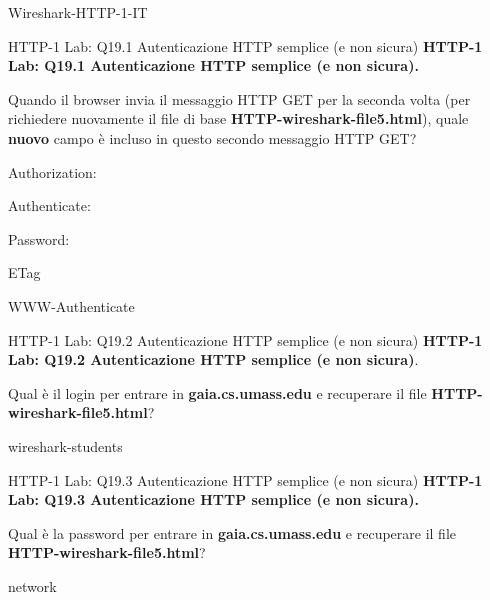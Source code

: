 \documentclass[a4paper]{article}
\begin{document}
\begin{quiz}{Wireshark-HTTP-1-IT}
\begin{multi}[points=1,shuffle]{HTTP-1 Lab: Q19.1 Autenticazione HTTP semplice (e non sicura)}
\textbf{HTTP-1 Lab: Q19.1 Autenticazione HTTP semplice (e non sicura).}

Quando il browser invia il messaggio HTTP GET per la seconda volta (per richiedere nuovamente il file di base \textbf{HTTP-wireshark-file5.html}), quale \textbf{nuovo} campo è incluso in questo secondo messaggio HTTP GET?
\item* Authorization:
\item Authenticate:
\item Password:
\item ETag
\item WWW-Authenticate
\end{multi}

\begin{shortanswer}[points=1]{HTTP-1 Lab: Q19.2 Autenticazione HTTP semplice (e non sicura)}
\textbf{HTTP-1 Lab: Q19.2 Autenticazione HTTP semplice (e non sicura)}.

Qual è il login per entrare in \textbf{gaia.cs.umass.edu} e recuperare il file \textbf{HTTP-wireshark-file5.html}?
\item wireshark-students
\end{shortanswer}

\begin{shortanswer}[points=1,shuffle]{HTTP-1 Lab: Q19.3 Autenticazione HTTP semplice (e non sicura)}
\textbf{HTTP-1 Lab: Q19.3 Autenticazione HTTP semplice (e non sicura).} 

Qual è la password per entrare in \textbf{gaia.cs.umass.edu} e recuperare il file \textbf{HTTP-wireshark-file5.html}?
\item network
\end{shortanswer}

\end{quiz}
\end{document}
